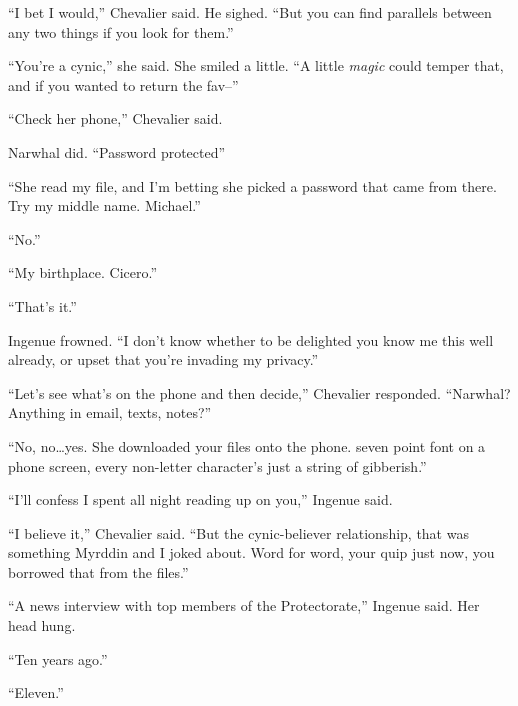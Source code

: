``I bet I would,'' Chevalier said.  He sighed.  ``But you can find parallels between any two things if you look for them.''



``You're a cynic,'' she said.  She smiled a little.  ``A little \emph{magic} could temper that, and if you wanted to return the fav--''



``Check her phone,'' Chevalier said.



Narwhal did.  ``Password protected''



``She read my file, and I'm betting she picked a password that came from there.  Try my middle name.  Michael.''



``No.''



``My birthplace.  Cicero.''



``That's it.''



Ingenue frowned.  ``I don't know whether to be delighted you know me this well already, or upset that you're invading my privacy.''



``Let's see what's on the phone and then decide,'' Chevalier responded.  ``Narwhal?  Anything in email, texts, notes?''



``No, no\ldots yes.  She downloaded your files onto the phone.  seven point font on a phone screen, every non-letter character's just a string of gibberish.''



``I'll confess I spent all night reading up on you,'' Ingenue said.



``I believe it,'' Chevalier said.  ``But the cynic-believer relationship, that was something Myrddin and I joked about.  Word for word, your quip just now, you borrowed that from the files.''



``A news interview with top members of the Protectorate,'' Ingenue said.  Her head hung.



``Ten years ago.''



``Eleven.''



